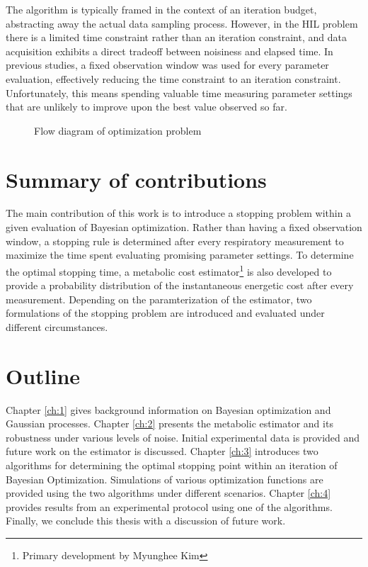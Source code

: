 The algorithm is typically framed in the context of an iteration budget, abstracting away the actual data sampling process. However, in the HIL problem there is a limited time constraint rather than an iteration constraint, and data acquisition exhibits a direct tradeoff between noisiness and elapsed time. In previous studies, a fixed observation window was used for every parameter evaluation, effectively reducing the time constraint to an iteration constraint. Unfortunately, this means spending valuable time measuring parameter settings that are unlikely to improve upon the best value observed so far.

\begin{figure}
\centering

\caption{Flow diagram of optimization problem}
\end{figure}

\section*{Summary of contributions}
The main contribution of this work is to introduce a stopping problem within a given evaluation of Bayesian optimization. Rather than having a fixed observation window, a stopping rule is determined after every respiratory measurement to maximize the time spent evaluating promising parameter settings. To determine the optimal stopping time, a metabolic cost estimator\footnote{Primary development by Myunghee Kim} is also developed to provide a probability distribution of the instantaneous energetic cost after every measurement. Depending on the paramterization of the estimator, two  formulations of the stopping problem are introduced and evaluated under different circumstances.

\section*{Outline}
Chapter \ref{ch:1} gives background information on Bayesian optimization and Gaussian processes. Chapter \ref{ch:2} presents the metabolic estimator and its robustness under various levels of noise. Initial experimental data is provided and future work on the estimator is discussed. Chapter \ref{ch:3} introduces two algorithms for determining the optimal stopping point within an iteration of Bayesian Optimization. Simulations of various optimization functions are provided using the two algorithms under different scenarios. Chapter \ref{ch:4} provides results from an experimental protocol using one of the algorithms. Finally, we conclude this thesis with a discussion of future work.